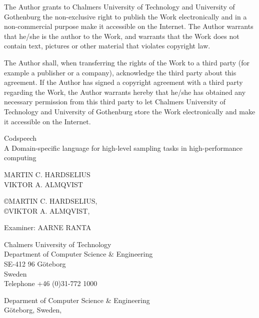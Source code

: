 \thispagestyle{empty}
The Author grants to Chalmers University of Technology and University
of Gothenburg the non-exclusive right to publish the Work
electronically and in a non-commercial purpose make it accessible on
the Internet.  The Author warrants that he/she is the author to the
Work, and warrants that the Work does not contain text, pictures or
other material that violates copyright law.

The Author shall, when transferring the rights of the Work to a third
party (for example a publisher or a company), acknowledge the third
party about this agreement. If the Author has signed a copyright
agreement with a third party regarding the Work, the Author warrants
hereby that he/she has obtained any necessary permission from this
third party to let Chalmers University of Technology and University of
Gothenburg store the Work electronically and make it accessible on the
Internet.

\vfill

\begin{flushleft}
Codspeech\\
A Domain-specific language for high-level sampling tasks in
high-performance computing
\vspace{11pt}

MARTIN C. HARDSELIUS\\
VIKTOR A. ALMQVIST
\vspace{11pt}

\copyright{MARTIN C. HARDSELIUS},  \\
\copyright{VIKTOR A. ALMQVIST}, 
\vspace{11pt}

Examiner: {AARNE RANTA}
\vspace{11pt}

Chalmers University of Technology\\
Department of Computer Science \& Engineering\\
SE-412 96 Göteborg\\
Sweden\\
Telephone +46 (0)31-772 1000
\vspace{66pt}

Deparment of Computer Science \& Engineering\\
Göteborg, Sweden, 
\end{flushleft}
